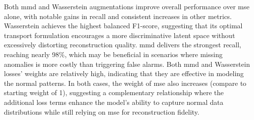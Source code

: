 \begin{table}[h!]
\centering
\caption{Impact of additional loss terms alongside \gls{mse} loss.}
\label{tab:arae-loss-aug-results}
\end{table}


Both \gls{mmd} and Wasserstein augmentations improve overall performance over \gls{mse} alone, with notable gains in recall and consistent increases in other metrics.
Wasserstein achieves the highest balanced F1-score, suggesting that its optimal transport formulation encourages a more discriminative latent space without excessively distorting reconstruction quality.
\gls{mmd} delivers the strongest recall, reaching nearly 98\%, which may be beneficial in scenarios where missing anomalies is more costly than triggering false alarms.
Both \gls{mmd} and Wasserstein losses' weights are relatively high, indicating that they are effective in modeling the normal patterns.
In both cases, the weight of \gls{mse} also increases (compare to starting weight of 1), suggesting a complementary relationship where the additional loss terms enhance the model's ability to capture normal data distributions while still relying on \gls{mse} for reconstruction fidelity.

